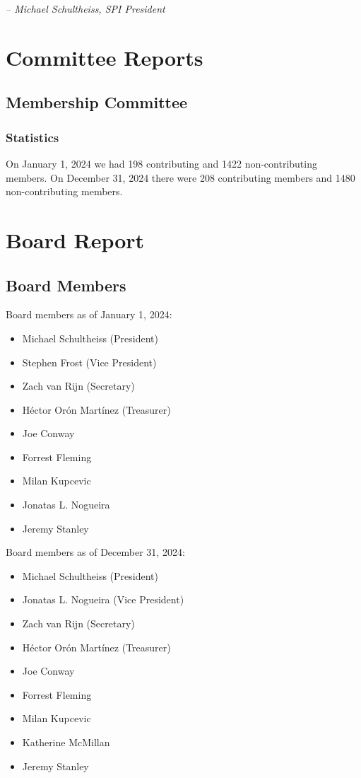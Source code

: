 \documentclass[a4paper]{report}
\begin{document}
  \emph{-- Michael Schultheiss, SPI President}

\newpage

\tableofcontents

\newpage

\chapter{Committee Reports}
\section{Membership Committee}

\subsection{Statistics}

On January 1, 2024 we had 198 contributing and 1422 non-contributing members.  On December 31, 2024 there were 208 contributing members and 1480 non-contributing members.

\chapter{Board Report}
\section{Board Members}

Board members as of January 1, 2024:

\begin{itemize}
\item Michael Schultheiss (President)
\item Stephen Frost (Vice President)
\item Zach van Rijn (Secretary)
\item Héctor Orón Martínez (Treasurer)
\item Joe Conway
\item Forrest Fleming
\item Milan Kupcevic
\item Jonatas L. Nogueira
\item Jeremy Stanley
\end{itemize}

Board members as of December 31, 2024:

\begin{itemize}
\item Michael Schultheiss (President)
\item Jonatas L. Nogueira (Vice President)
\item Zach van Rijn (Secretary)
\item Héctor Orón Martínez (Treasurer)
\item Joe Conway
\item Forrest Fleming
\item Milan Kupcevic
\item Katherine McMillan
\item Jeremy Stanley
\end{itemize}
\end{document}
